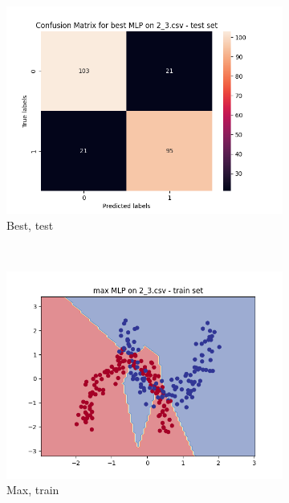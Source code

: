\documentclass[12pt]{article}
\newcommand*{\subfigwidth}{0.24\textwidth}
\begin{document}
\begin{figure}[H]
\begin{subfigure}[t]{\subfigwidth}
        \includegraphics[width=\linewidth]{img/exp_2/mlp/2_3/best/test_matrix.png}
        \caption{Best, test}
    \end{subfigure} 
    \\
    \begin{subfigure}[t]{\subfigwidth}
        \includegraphics[width=\linewidth]{img/exp_2/mlp/2_3/max/train_boundary.png}
        \caption{Max, train}
    \end{subfigure}
    \hfill
    \begin{subfigure}[t]{\subfigwidth}

\end{subfigure}
\end{figure}
\end{document}
